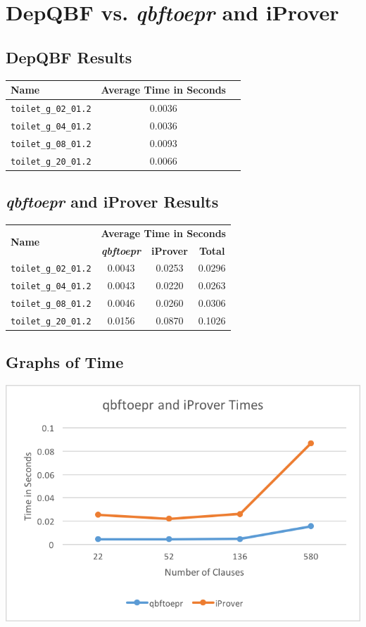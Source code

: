 \chapter{DepQBF vs. \textit{qbftoepr} and iProver} \label{depqbfvsqbftoepr}

\section{DepQBF Results}

\begin{center}
\begin{tabular}{| l | c | c |}
\hline
\textbf{Name} & \textbf{Average Time in Seconds} \\ \hline
\texttt{toilet\_g\_02\_01.2} & 0.0036 \\
\texttt{toilet\_g\_04\_01.2} & 0.0036 \\
\texttt{toilet\_g\_08\_01.2} & 0.0093 \\
\texttt{toilet\_g\_20\_01.2} & 0.0066 \\
\hline
\end{tabular}
\end{center}

\section{\textit{qbftoepr} and iProver Results}

\begin{center}
\begin{tabular}{| l | c | c | c |}
\hline
\multirow{2}{*}{\textbf{Name}} & \multicolumn{3}{|l|}{\textbf{Average Time in Seconds}} \\
\cline{2-4}
& \textbf{\textit{qbftoepr}} & \textbf{iProver} & \textbf{Total} \\
\hline
\texttt{toilet\_g\_02\_01.2} & 0.0043 & 0.0253 & 0.0296 \\
\texttt{toilet\_g\_04\_01.2} & 0.0043 & 0.0220 & 0.0263 \\
\texttt{toilet\_g\_08\_01.2} & 0.0046 & 0.0260 & 0.0306 \\
\texttt{toilet\_g\_20\_01.2} & 0.0156 & 0.0870 & 0.1026 \\
\hline
\end{tabular}
\end{center}

\section{Graphs of Time}

\begin{center}
\includegraphics{qbftoeprandiprovertimes.png}
\end{center}

